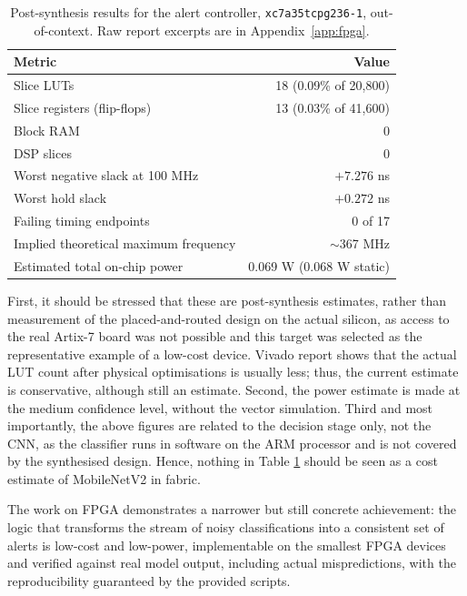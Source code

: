 \begin{table}[htbp]
\centering
\caption{Post-synthesis results for the alert controller, \texttt{xc7a35tcpg236-1}, out-of-context. Raw report excerpts are in Appendix~\ref{app:fpga}.}
\label{tab:fpga}
\small
\begin{tabular}{lr}
\toprule
\textbf{Metric} & \textbf{Value} \\
\midrule
Slice LUTs & 18 (0.09\% of 20{,}800) \\
Slice registers (flip-flops) & 13 (0.03\% of 41{,}600) \\
Block RAM & 0 \\
DSP slices & 0 \\
Worst negative slack at 100 MHz & $+7.276$ ns \\
Worst hold slack & $+0.272$ ns \\
Failing timing endpoints & 0 of 17 \\
Implied theoretical maximum frequency & $\sim$367 MHz \\
Estimated total on-chip power & 0.069 W (0.068 W static) \\
\bottomrule
\end{tabular}
\end{table}


First, it should be stressed that these are post-synthesis estimates, rather than measurement of the placed-and-routed design on the actual silicon, as access to the real Artix-7 board was not possible and this target was selected as the representative example of a low-cost device. Vivado report shows that the actual LUT count after physical optimisations is usually less; thus, the current estimate is conservative, although still an estimate. Second, the power estimate is made at the medium confidence level, without the vector simulation. Third and most importantly, the above figures are related to the decision stage only, not the CNN, as the classifier runs in software on the ARM processor and is not covered by the synthesised design. Hence, nothing in Table \ref{tab:fpga} should be seen as a cost estimate of MobileNetV2 in fabric.

The work on FPGA demonstrates a narrower but still concrete achievement: the logic that transforms the stream of noisy classifications into a consistent set of alerts is low-cost and low-power, implementable on the smallest FPGA devices and verified against real model output, including actual mispredictions, with the reproducibility guaranteed by the provided scripts.

